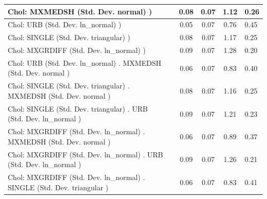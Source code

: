 \begin{table}
\begin{center}
\begin{tabular}{|l|l|c|c|c|l|}
			\hline
			 Chol: MXMEDSH (Std. Dev. normal) ) &  & 0.08 & 0.07 & 1.12 & 0.26 \\
			\hline
			 Chol: URB (Std. Dev. ln_normal) ) &  & 0.05 & 0.07 & 0.76 & 0.45 \\
			\hline
			 Chol: SINGLE (Std. Dev. triangular) ) &  & 0.08 & 0.07 & 1.17 & 0.25 \\
			\hline
			 Chol: MXGRDIFF (Std. Dev. ln_normal) ) &  & 0.09 & 0.07 & 1.28 & 0.20 \\
			\hline
			 Chol: URB (Std. Dev. ln_normal) . MXMEDSH (Std. Dev.   normal ) &  & 0.06 & 0.07 & 0.83 & 0.40 \\
			\hline
			 Chol: SINGLE (Std. Dev. triangular) . MXMEDSH (Std. Dev.   normal ) &  & 0.08 & 0.07 & 1.16 & 0.25 \\
			\hline
			 Chol: SINGLE (Std. Dev. triangular) . URB (Std. Dev.   ln_normal ) &  & 0.09 & 0.07 & 1.21 & 0.23 \\
			\hline
			 Chol: MXGRDIFF (Std. Dev. ln_normal) . MXMEDSH (Std. Dev.   normal ) &  & 0.06 & 0.07 & 0.89 & 0.37 \\
			\hline
			 Chol: MXGRDIFF (Std. Dev. ln_normal) . URB (Std. Dev.   ln_normal ) &  & 0.09 & 0.07 & 1.26 & 0.21 \\
			\hline
			 Chol: MXGRDIFF (Std. Dev. ln_normal) . SINGLE (Std. Dev.   triangular ) &  & 0.06 & 0.07 & 0.83 & 0.41 \\
			\hline
		\end{tabular}
	\end{center}
\end{table}